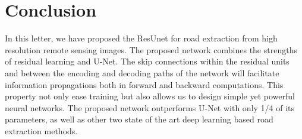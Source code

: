 \documentclass[journal]{IEEEtran}
\begin{document}
\section{Conclusion}
\label{sec:conslusion}
In this letter, we have proposed the ResUnet for road extraction from high resolution remote sensing images. The proposed network combines the strengths of residual learning and U-Net. The skip connections within the residual units and between the encoding and decoding paths of the network will facilitate information propagations both in forward and backward computations. This property not only ease training but also allows us to design simple yet powerful neural networks. The proposed network outperforms U-Net with only 1/4 of its parameters, as well as other two state of the art deep learning based road extraction methods.





\ifCLASSOPTIONcaptionsoff
  \newpage
\fi



\end{document}
